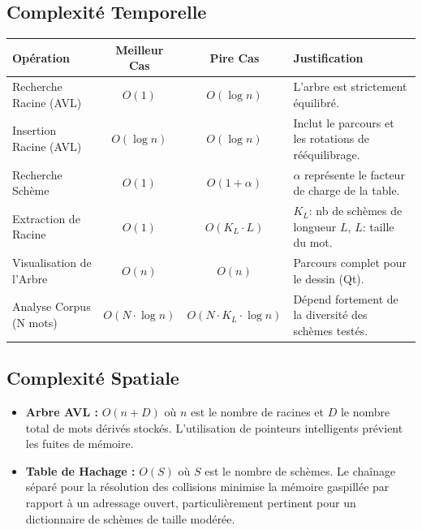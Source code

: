 \documentclass[12pt,a4paper]{article}
\begin{document}
\subsection{Complexité Temporelle}
\begin{table}[htbp]
	\small
	\renewcommand{\arraystretch}{1.4}
	\begin{tabular}{|p{4.5cm}|c|c|p{5.5cm}|}
		\hline
		\textbf{Opération}       & \textbf{Meilleur Cas} & \textbf{Pire Cas}             & \textbf{Justification}                                    \\
		\hline
		Recherche Racine (AVL)   & $O(1)$                & $O(\log n)$                   & L'arbre est strictement équilibré.                        \\
		\hline
		Insertion Racine (AVL)   & $O(\log n)$           & $O(\log n)$                   & Inclut le parcours et les rotations de rééquilibrage.     \\
		\hline
		Recherche Schème         & $O(1)$                & $O(1 + \alpha)$               & $\alpha$ représente le facteur de charge de la table.     \\
		\hline
		Extraction de Racine     & $O(1)$                & $O(K_L \cdot L)$              & $K_L$: nb de schèmes de longueur $L$, $L$: taille du mot. \\
		\hline
		Visualisation de l'Arbre & $O(n)$                & $O(n)$                        & Parcours complet pour le dessin (Qt).                     \\
		\hline
		Analyse Corpus (N mots)  & $O(N \cdot \log n)$   & $O(N \cdot K_L \cdot \log n)$ & Dépend fortement de la diversité des schèmes testés.      \\
		\hline
	\end{tabular}
\end{table}

\subsection{Complexité Spatiale}
\begin{itemize}[label=\textbullet, itemsep=2pt]
	\item \textbf{Arbre AVL :} $O(n + D)$ où $n$ est le nombre de racines et $D$ le nombre total de mots dérivés stockés. L'utilisation de pointeurs intelligents prévient les fuites de mémoire.
	\item \textbf{Table de Hachage :} $O(S)$ où $S$ est le nombre de schèmes. Le chaînage séparé pour la résolution des collisions minimise la mémoire gaspillée par rapport à un adressage ouvert, particulièrement pertinent pour un dictionnaire de schèmes de taille modérée.
\end{itemize}
\end{document}
